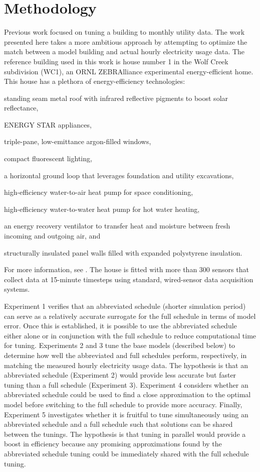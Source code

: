 \documentclass[preprint, review, 12pt]{elsarticle}
\begin{document}
\section{Methodology}
\label{sec:methodology}
Previous work \cite{cit:garrett2013} focused on tuning a building to monthly utility data. The work presented here takes a more ambitious approach by attempting to optimize the match between a model building and actual hourly electricity usage data. The reference building used in this work is house number 1 in the Wolf Creek subdivision (WC1), an ORNL ZEBRAlliance experimental energy-efficient home. This house has a plethora of energy-efficiency technologies: 
\begin{inparaenum}[(1)]
\item standing seam metal roof with infrared reflective pigments to boost solar reflectance,
\item ENERGY STAR appliances, 
\item triple-pane, low-emittance argon-filled windows, 
\item compact fluorescent lighting, 
\item a horizontal ground loop that leverages foundation and utility excavations, 
\item high-efficiency water-to-air heat pump for space conditioning, 
\item high-efficiency water-to-water heat pump for hot water heating, 
\item an energy recovery ventilator to transfer heat and moisture between fresh incoming and outgoing air, and 
\item structurally insulated panel walls filled with expanded polystyrene insulation.
\end{inparaenum}
For more information, see \cite{cit:miller2012,cit:biswas2012}. The house is fitted with more than 300 sensors that collect data at 15-minute timesteps using standard, wired-sensor data acquisition systems.

Experiment 1 verifies that an abbreviated schedule (shorter simulation period) can serve as a relatively accurate surrogate for the full schedule in terms of model error. Once this is established, it is possible to use the abbreviated schedule either alone or in conjunction with the full schedule to reduce computational time for tuning. Experiments 2 and 3 tune the base models (described below) to determine how well the abbreviated and full schedules perform, respectively, in matching the measured hourly electricity usage data. The hypothesis is that an abbreviated schedule (Experiment 2) would provide less accurate but faster tuning than a full schedule (Experiment 3). Experiment 4 considers whether an abbreviated schedule could be used to find a close approximation to the optimal model before switching to the full schedule to provide more accuracy. Finally, Experiment 5 investigates whether it is fruitful to tune simultaneously using an abbreviated schedule and a full schedule such that solutions can be shared between the tunings. The hypothesis is that tuning in parallel would provide a boost in efficiency because any promising approximations found by the abbreviated schedule tuning could be immediately shared with the full schedule tuning.
 
\end{document}
